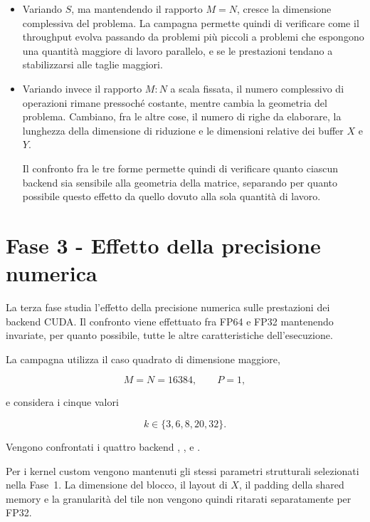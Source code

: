 \begin{itemize}
      \item Variando $S$, ma mantendendo il rapporto $M=N$, cresce la dimensione complessiva del
      problema. La campagna permette quindi di verificare come il throughput
      evolva passando da problemi più piccoli a problemi che espongono una
      quantità maggiore di lavoro parallelo, e se le prestazioni tendano a
      stabilizzarsi alle taglie maggiori.
      \item Variando invece il rapporto $M:N$ a scala fissata, il numero complessivo
      di operazioni rimane pressoché costante, mentre cambia la geometria del
      problema. Cambiano, fra le altre cose, il numero di righe da elaborare,
      la lunghezza della dimensione di riduzione e le dimensioni relative dei
      buffer $X$ e $Y$.

      Il confronto fra le tre forme permette quindi di verificare quanto ciascun
      backend sia sensibile alla geometria della matrice, separando per quanto
      possibile questo effetto da quello dovuto alla sola quantità di lavoro.

\end{itemize}

\section{Fase 3 - Effetto della precisione numerica}
\label{sec:fase3-precisione}

La terza fase studia l'effetto della precisione numerica sulle prestazioni
dei backend CUDA. Il confronto viene effettuato fra FP64 e FP32 mantenendo
invariate, per quanto possibile, tutte le altre caratteristiche
dell'esecuzione.

La campagna utilizza il caso quadrato di dimensione maggiore,

\[
M=N=\num{16384},
\qquad
P=1,
\]

e considera i cinque valori

\[
k\in\{3,6,8,20,32\}.
\]

Vengono confrontati i quattro backend
,
,
e .

Per i kernel custom vengono mantenuti gli stessi parametri strutturali
selezionati nella Fase~1. La dimensione del blocco, il layout di $X$,
il padding della shared memory e la granularità del tile non vengono quindi
ritarati separatamente per FP32.

